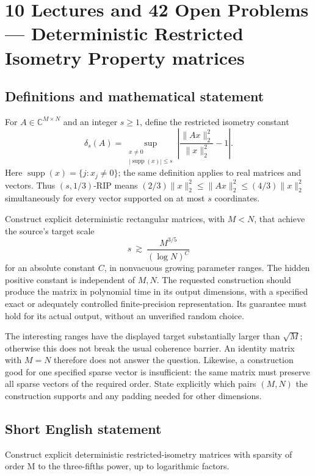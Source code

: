 \documentclass[11pt,a4paper]{article}
\begin{document}
\section*{10 Lectures and 42 Open Problems — Deterministic Restricted Isometry Property matrices}\label{statement}

\subsection{Definitions and mathematical statement}
For $A\in\mathbb C^{M\times N}$ and an integer $s\ge1$, define the
restricted isometry constant
\[
 \delta_s(A)=\sup_{\substack{x\ne0\\|\operatorname{supp}(x)|\le s}}
             \left|\frac{\|Ax\|_2^2}{\|x\|_2^2}-1\right|.
\]
Here $\operatorname{supp}(x)=\{j:x_j\ne0\}$; the same definition applies
to real matrices and vectors. Thus $(s,1/3)$-RIP means
$(2/3)\|x\|_2^2\le\|Ax\|_2^2\le(4/3)\|x\|_2^2$ simultaneously
for every vector supported on at most $s$ coordinates.

Construct explicit deterministic rectangular matrices, with $M<N$,
that achieve the source's target scale
\[
                  s\ \gtrsim\ \frac{M^{3/5}}{(\log N)^C}
\]
for an absolute constant $C$, in nonvacuous growing parameter ranges.
The hidden positive constant is independent of $M,N$. The requested
construction should produce the matrix in polynomial time in its
output dimensions, with a specified exact or adequately controlled
finite-precision representation. Its guarantee must hold for its
actual output, without an unverified random choice.

The interesting ranges have the displayed target substantially larger
than $\sqrt M$; otherwise this does not break the usual coherence
barrier. An identity matrix with $M=N$ therefore does not answer the
question. Likewise, a construction good for one specified sparse
vector is insufficient: the same matrix must preserve all sparse
vectors of the required order. State explicitly which pairs $(M,N)$
the construction supports and any padding needed for other dimensions.
\subsection{Short English statement}
Construct explicit deterministic restricted-isometry matrices with sparsity of order M to the three-fifths power, up to logarithmic factors.
\end{document}

